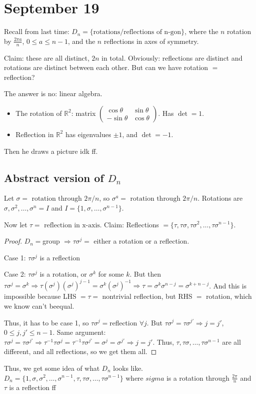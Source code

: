\documentclass{article}
\theoremstyle{plain}
\theoremstyle{remark}
\newcommand{\R}{{\mathbb R}}
\begin{document}
\section{September 19}
Recall from last time: $D_n = \{\text{rotations/reflections of n-gon}\}$,
where the $n$ rotation by $\frac{2\pi a}{n}$, $0\leq a \leq n-1$,
and the $n$ reflections in axes of symmetry.

Claim: these are all distinct, $2n$ in total.
Obviously: reflections are distinct and rotations are distinct between each other.
But can we have rotation $=$ reflection?

The answer is no: linear algebra.
\begin{itemize}
	\item The rotation of $\R^2$: matrix
	$\begin{pmatrix} \cos\theta & \sin\theta \\ -\sin\theta & \cos\theta \end{pmatrix}$.
	Has $\det = 1$.
	\item Reflection in $\R^2$ has eigenvalues $\pm 1$, and $\det = -1$.
\end{itemize}
Then he draws a picture idk ff.

\subsection*{Abstract version of $D_n$}
Let $\sigma = \text{ rotation through } 2\pi/n$,
so $\sigma^a = \text{ rotation through } 2\pi/n$.
Rotations are $\sigma, \sigma^2, \dots, \sigma^n = I$
and $I = \{1,\sigma,\dots,\sigma^{n-1}\}$.

Now let $\tau  = \text{ reflection in x-axis}$.
Claim: Reflections $ = \{\tau, \tau\sigma, \tau\sigma^2, \dots, \tau\sigma^{n-1}\}$.
\begin{proof}
	$D_n = $group $\Rightarrow \tau\sigma^j =$ either a rotation or a reflection.
	
	Case 1: $\tau\sigma^j$ is a reflection

	Case 2: $\tau\sigma^j$ is a rotation, or $\sigma^k$ for some $k$.
	But then $\tau \sigma^j = \sigma^k \Rightarrow \tau(\sigma^j)(\sigma^j)^{j-1}
	= \sigma^k(\sigma^j)^{-1} \Rightarrow \tau = \sigma^k\sigma^{n-j}=\sigma^{k+n-j}$.
	And this is impossible because LHS $=\tau=$ nontrivial reflection,
	but RHS $=$ rotation, which we know can't beequal.
	
	Thus, it has to be case 1, so $\tau\sigma^j = $reflection $\forall j$.
	But $\tau\sigma^j = \tau\sigma^{j'} \Rightarrow j=j'$, $0\leq j,j' \leq n-1$.
	Same argument: $\tau\sigma^j = \tau\sigma^{j'} \Rightarrow \tau^{-1}\tau\sigma^j
	= \tau^{-1}\tau\sigma^{j'} = \sigma^j = \sigma^{j'} \Rightarrow j=j'$.
	Thus, $\tau,\tau\sigma,\dots,\tau\sigma^{n-1}$ are all different,
	and all reflections, so we get them all.
\end{proof}
Thus, we get some idea of what $D_n$ looks like.
$D_n = \{1,\sigma,\sigma^2,\dots,\sigma^{n-1}, \tau,\tau\sigma,\dots,\tau\sigma^{n-1}\}$
where $sigma$ is a rotation through $\frac{2\pi}{n}$
and $\tau$ is a reflection ff
\end{document}
